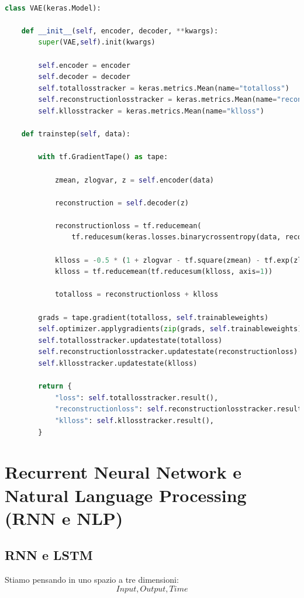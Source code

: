\begin{lstlisting}[language=Python, caption={Esempio di VAE}]
    
class VAE(keras.Model):

    def __init__(self, encoder, decoder, **kwargs):
        super(VAE,self).init(kwargs)

        self.encoder = encoder
        self.decoder = decoder
        self.totallosstracker = keras.metrics.Mean(name="totalloss")
        self.reconstructionlosstracker = keras.metrics.Mean(name="reconstructionloss")
        self.kllosstracker = keras.metrics.Mean(name="klloss")

    def trainstep(self, data):

        with tf.GradientTape() as tape:

            zmean, zlogvar, z = self.encoder(data)

            reconstruction = self.decoder(z)

            reconstructionloss = tf.reducemean(
                tf.reducesum(keras.losses.binarycrossentropy(data, reconstruction), axis=(1, 2)))

            klloss = -0.5 * (1 + zlogvar - tf.square(zmean) - tf.exp(zlogvar))
            klloss = tf.reducemean(tf.reducesum(klloss, axis=1))

            totalloss = reconstructionloss + klloss

        grads = tape.gradient(totalloss, self.trainableweights)
        self.optimizer.applygradients(zip(grads, self.trainableweights))
        self.totallosstracker.updatestate(totalloss)
        self.reconstructionlosstracker.updatestate(reconstructionloss)
        self.kllosstracker.updatestate(klloss)

        return {
            "loss": self.totallosstracker.result(),
            "reconstructionloss": self.reconstructionlosstracker.result(),
            "klloss": self.kllosstracker.result(),
        }
\end{lstlisting}

\section{Recurrent Neural Network e Natural Language Processing (RNN e NLP)}
\subsection{RNN e LSTM}
Stiamo pensando in uno spazio a tre dimensioni:
\[
    Input, Output, Time
\]

